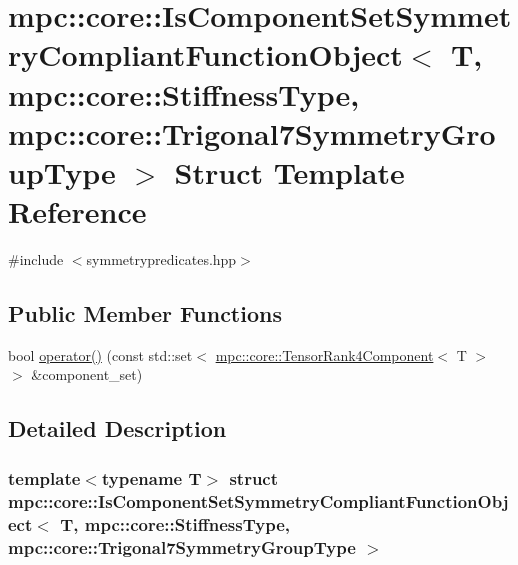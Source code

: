 \hypertarget{structmpc_1_1core_1_1_is_component_set_symmetry_compliant_function_object_3_01_t_00_01mpc_1_1corbe0c5d4e21105c144a825f64d1e00184}{}\section{mpc\+:\+:core\+:\+:Is\+Component\+Set\+Symmetry\+Compliant\+Function\+Object$<$ T, mpc\+:\+:core\+:\+:Stiffness\+Type, mpc\+:\+:core\+:\+:Trigonal7\+Symmetry\+Group\+Type $>$ Struct Template Reference}
\label{structmpc_1_1core_1_1_is_component_set_symmetry_compliant_function_object_3_01_t_00_01mpc_1_1corbe0c5d4e21105c144a825f64d1e00184}


{\ttfamily \#include $<$symmetrypredicates.\+hpp$>$}

\subsection*{Public Member Functions}
\begin{DoxyCompactItemize}
\item 
bool \mbox{\hyperlink{structmpc_1_1core_1_1_is_component_set_symmetry_compliant_function_object_3_01_t_00_01mpc_1_1corbe0c5d4e21105c144a825f64d1e00184_ac63d8d09964def15a85afc9291ff55da}{operator()}} (const std\+::set$<$ \mbox{\hyperlink{namespacempc_1_1core_ac3a232afc7c680d580628e834030482f}{mpc\+::core\+::\+Tensor\+Rank4\+Component}}$<$ T $>$ $>$ \&component\+\_\+set)
\end{DoxyCompactItemize}


\subsection{Detailed Description}
\subsubsection*{template$<$typename T$>$\newline
struct mpc\+::core\+::\+Is\+Component\+Set\+Symmetry\+Compliant\+Function\+Object$<$ T, mpc\+::core\+::\+Stiffness\+Type, mpc\+::core\+::\+Trigonal7\+Symmetry\+Group\+Type $>$}



